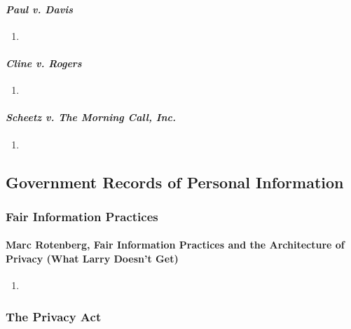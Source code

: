 \paragraph{\emph{Paul v. Davis}} %

\begin{enumerate}
    \item 
\end{enumerate}

\paragraph{\emph{Cline v. Rogers}} %

\begin{enumerate}
    \item 
\end{enumerate}

\paragraph{\emph{Scheetz v. The Morning Call, Inc.}} %

\begin{enumerate}
    \item 
\end{enumerate}

\subsection{Government Records of Personal Information}

\subsubsection{Fair Information Practices}


\paragraph{Marc Rotenberg, Fair Information Practices and the Architecture of 
Privacy (What Larry Doesn't Get)} %

\begin{enumerate}
    \item 
\end{enumerate}

\subsubsection{The Privacy Act}

